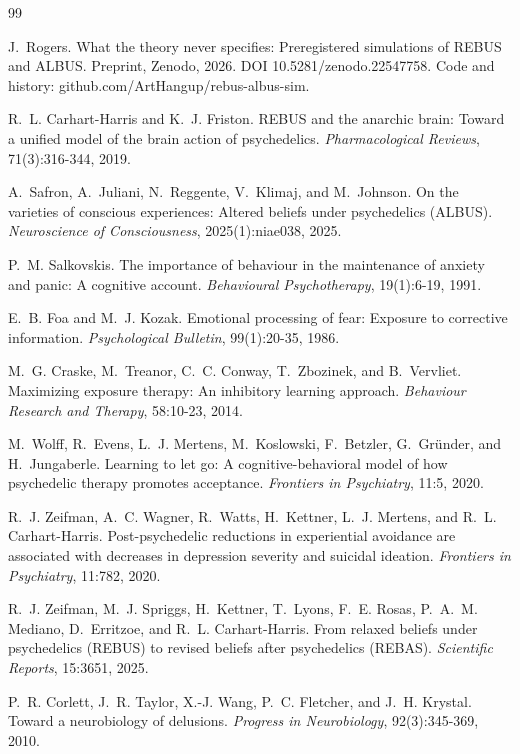 \documentclass[11pt]{article}
\begin{document}
\begin{thebibliography}{99}

 J.~Rogers. What the theory never specifies: Preregistered
simulations of REBUS and ALBUS. Preprint, Zenodo, 2026. DOI
10.5281/zenodo.22547758. Code and history: github.com/ArtHangup/rebus-albus-sim.

 R.~L. Carhart-Harris and K.~J. Friston. REBUS and the
anarchic brain: Toward a unified model of the brain action of psychedelics.
\emph{Pharmacological Reviews}, 71(3):316-344, 2019.

 A.~Safron, A.~Juliani, N.~Reggente, V.~Klimaj, and
M.~Johnson. On the varieties of conscious experiences: Altered beliefs under
psychedelics (ALBUS). \emph{Neuroscience of Consciousness}, 2025(1):niae038, 2025.

 P.~M. Salkovskis. The importance of behaviour in the
maintenance of anxiety and panic: A cognitive account. \emph{Behavioural
Psychotherapy}, 19(1):6-19, 1991.

 E.~B. Foa and M.~J. Kozak. Emotional processing of fear:
Exposure to corrective information. \emph{Psychological Bulletin}, 99(1):20-35,
1986.

 M.~G. Craske, M.~Treanor, C.~C. Conway, T.~Zbozinek, and
B.~Vervliet. Maximizing exposure therapy: An inhibitory learning approach.
\emph{Behaviour Research and Therapy}, 58:10-23, 2014.

 M.~Wolff, R.~Evens, L.~J. Mertens, M.~Koslowski, F.~Betzler,
G.~Gr\"under, and H.~Jungaberle. Learning to let go: A cognitive-behavioral model
of how psychedelic therapy promotes acceptance. \emph{Frontiers in Psychiatry},
11:5, 2020.

 R.~J. Zeifman, A.~C. Wagner, R.~Watts, H.~Kettner,
L.~J. Mertens, and R.~L. Carhart-Harris. Post-psychedelic reductions in
experiential avoidance are associated with decreases in depression severity and
suicidal ideation. \emph{Frontiers in Psychiatry}, 11:782, 2020.

 R.~J. Zeifman, M.~J. Spriggs, H.~Kettner, T.~Lyons,
F.~E. Rosas, P.~A.~M. Mediano, D.~Erritzoe, and R.~L. Carhart-Harris. From
relaxed beliefs under psychedelics (REBUS) to revised beliefs after psychedelics
(REBAS). \emph{Scientific Reports}, 15:3651, 2025.

 P.~R. Corlett, J.~R. Taylor, X.-J. Wang, P.~C. Fletcher,
and J.~H. Krystal. Toward a neurobiology of delusions. \emph{Progress in
Neurobiology}, 92(3):345-369, 2010.


\end{thebibliography}
\end{document}

